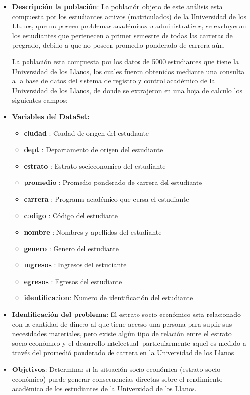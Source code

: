 \documentclass[conference]{IEEEtran}\usepackage[]{graphicx}\usepackage[]{color}
\begin{document}
  \begin{itemize}
   \item \textbf{Descripción la población}: La población objeto de este análisis esta compuesta por los estudiantes activos (matriculados) de la Universidad de los Llanos, que no poseen problemas académicos o administrativos; se excluyeron los estudiantes que pertenecen a primer semestre de todas las carreras de pregrado, debido a que no poseen promedio ponderado de carrera aún. 
   \bigskip
 
   La población esta compuesta por los datos de 5000 estudiantes que tiene la Universidad de los Llanos, los cuales fueron obtenidos mediante una consulta a la base de datos del sistema de registro y control académico de la Universidad de los Llanos, de donde se extrajeron en una hoja de calculo los siguientes campos:
   
   \item \textbf{Variables del DataSet:}\\
	    
	   \begin{itemize}
		   \item \textbf{ciudad}   : Ciudad de origen del estudiante
		   \item \textbf{dept} 	   : Departamento de origen del estudiante
		   \item \textbf{estrato}  : Estrato socieconomico del estudiante
		   \item \textbf{promedio} : Promedio ponderado de carrera del estudiante
		   \item \textbf{carrera}  : Programa académico que cursa el estudiante
		   \item \textbf{codigo}   : Código del estudiante
		   \item \textbf{nombre}   : Nombres y apellidos del estudiante
		   \item \textbf{genero}   : Genero del estudiante
		   \item \textbf{ingresos} : Ingresos del estudiante
		   \item \textbf{egresos}  : Egresos del estudiante
		   \item \textbf{identificacion}: Numero de identificación del estudiante
		\end{itemize}
	   
	   \item \textbf{Identificación del problema}: El estrato socio económico esta relacionado con la cantidad de dinero al que tiene acceso una persona para suplir sus necesidades materiales, pero existe algún tipo de relación entre el estrato socio económico y el desarrollo intelectual, particularmente aquel es medido a través del promedió ponderado de carrera en la Universidad de los Llanos\\ 
	    
	   \item \textbf{Objetivos}: Determinar si la situación socio económica (estrato socio económico) puede generar consecuencias directas sobre el rendimiento académico de los estudiantes de la Universidad de los Llanos.
   
  \end{itemize}
\end{document}
